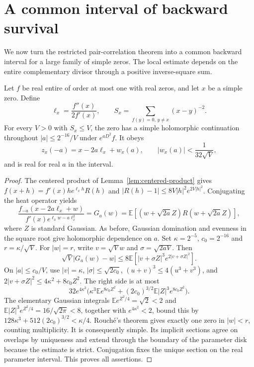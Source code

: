 \section{A common interval of backward survival}
\label{sec:survival}

We now turn the restricted pair-correlation theorem into a common backward interval for a large family of simple zeros. The local estimate depends on the entire complementary divisor through a positive inverse-square sum.

\begin{lemma}\label{lem:one-zero-survival}
Let $f$ be real entire of order at most one with real zeros, and let $x$ be a simple zero. Define
\[
 \ell_x=\frac{f''(x)}{2f'(x)},\qquad
 S_x=\sum_{f(y)=0,\,y\ne x}(x-y)^{-2}.
\]
For every $V>0$ with $S_x\le V$, the zero has a simple holomorphic continuation throughout $|a|\le2^{-16}/V$ under $e^{aD^2}f$. It obeys
\[
 z_x(-a)=x-2a\ell_x+w_x(a),\qquad
 |w_x(a)|<\frac1{32\sqrt V},
\]
and is real for real $a$ in the interval.
\end{lemma}
\begin{proof}
The centered product of Lemma~\ref{lem:centered-product} gives
$f(x+h)=f'(x)h e^{\ell_xh}R(h)$ and
$|R(h)-1|\le8V|h|^2e^{2V|h|^2}$. Conjugating the heat operator yields
\[
 \frac{f_{-a}(x-2a\ell_x+w)}{f'(x)e^{\ell_xw-a\ell_x^2}}
 =G_a(w)=\mathbb E[(w+\sqrt{2a}Z)R(w+\sqrt{2a}Z)],
\]
where $Z$ is standard Gaussian. As before, Gaussian domination and evenness in the square root give holomorphic dependence on $a$.
Set $\kappa=2^{-5}$, $c_0=2^{-16}$ and $r=\kappa/\sqrt V$. For $|w|=r$, write $v=\sqrt Vw$ and $\sigma=\sqrt{2aV}$. Then
\[
 \sqrt V|G_a(w)-w|
 \le8\mathbb E[|v+\sigma Z|^3e^{2|v+\sigma Z|^2}].
\]
On $|a|\le c_0/V$, use $|v|=\kappa$, $|\sigma|\le\sqrt{2c_0}$,
$(u+v)^3\le4(u^3+v^3)$, and
$2|v+\sigma Z|^2\le4\kappa^2+8c_0Z^2$.
The right side is at most
\[
 32e^{4\kappa^2}\bigl(
 \kappa^3\mathbb Ee^{8c_0Z^2}
 +(2c_0)^{3/2}\mathbb E|Z|^3e^{8c_0Z^2}\bigr).
\]
The elementary Gaussian integrals
$\mathbb Ee^{Z^2/4}=\sqrt2<2$ and
$\mathbb E|Z|^3e^{Z^2/4}=16/\sqrt{2\pi}<8$, together with
$e^{4\kappa^2}<2$, bound this by
$128\kappa^3+512(2c_0)^{3/2}<\kappa/4$.
Rouch\'e's theorem gives exactly one zero in $|w|<r$, counting multiplicity. It is consequently simple. Its implicit sections agree on overlaps by uniqueness and extend through the boundary of the parameter disk because the estimate is strict. Conjugation fixes the unique section on the real parameter interval. This proves all assertions.
\end{proof}

